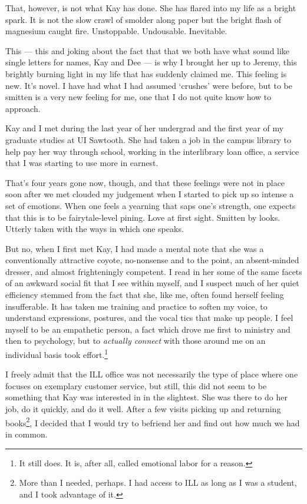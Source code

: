 That, however, is not what Kay has done. She has flared into my life as a bright spark. It is not the slow crawl of smolder along paper but the bright flash of magnesium caught fire. Unstoppable. Undousable. Inevitable.

This --- this and joking about the fact that that we both have what sound like single letters for names, Kay and Dee --- is why I brought her up to Jeremy, this brightly burning light in my life that has suddenly claimed me. This feeling is new. It's novel. I have had what I had assumed `crushes' were before, but to be smitten is a very new feeling for me, one that I do not quite know how to approach.

Kay and I met during the last year of her undergrad and the first year of my graduate studies at UI Sawtooth. She had taken a job in the campus library to help pay her way through school, working in the interlibrary loan office, a service that I was starting to use more in earnest.

That's four years gone now, though, and that these feelings were not in place soon after we met clouded my judgement when I started to pick up so intense a set of emotions. When one feels a yearning that saps one's strength, one expects that this is to be fairytale-level pining. Love at first sight. Smitten by looks. Utterly taken with the ways in which one speaks.

But no, when I first met Kay, I had made a mental note that she was a conventionally attractive coyote, no-nonsense and to the point, an absent-minded dresser, and almost frighteningly competent. I read in her some of the same facets of an awkward social fit that I see within myself, and I suspect much of her quiet efficiency stemmed from the fact that she, like me, often found herself feeling insufferable. It has taken me training and practice to soften my voice, to understand expressions, postures, and the vocal tics that make up people. I feel myself to be an empathetic person, a fact which drove me first to ministry and then to psychology, but to \emph{actually connect} with those around me on an individual basis took effort.\footnote{It still does. It is, after all, called emotional labor for a reason.}

I freely admit that the ILL office was not necessarily the type of place where one focuses on exemplary customer service, but still, this did not seem to be something that Kay was interested in in the slightest. She was there to do her job, do it quickly, and do it well. After a few visits picking up and returning books\footnote{More than I needed, perhaps. I had access to ILL as long as I was a student, and I took advantage of it.}, I decided that I would try to befriend her and find out how much we had in common.

